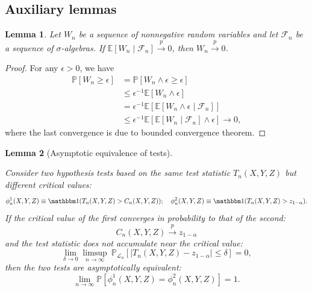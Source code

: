 \documentclass[12pt]{article}
\newtheorem{lemma}{Lemma}
\theoremstyle{definition}
\theoremstyle{remark}
\newcommand{\E}{\mathbb E}								%
\renewcommand{\P}{\mathbb{P}}							%
\newcommand{\indicator}{\mathbbm 1}						%
\newcommand{\convp}{\overset p \rightarrow}             %
\newcommand{\srx}{X}									%
\newcommand{\srz}{Z}									%
\newcommand{\sry}{Y}									%
\newcommand{\law}{\mathcal L}							%
\begin{document}
\subsection{Auxiliary lemmas}

\begin{lemma}
	\label{lem:conditional-expectation-to-unconditional}
	Let $W_n$ be a sequence of nonnegative random variables and let $\mathcal F_n$ be a sequence of $\sigma$-algebras. If $\E[W_n \mid \mathcal{F}_n]\convp 0$, then $ W_n \convp 0$.
\end{lemma}
\begin{proof}
	For any $\epsilon>0$, we have
	\begin{align}
		\P[W_n \geq \epsilon] &= \P[W_n \wedge \epsilon \geq \epsilon] \\
		&\leq \epsilon^{-1} \E[W_n \wedge \epsilon] \\
		&= \epsilon^{-1} \E[\E[W_n \wedge \epsilon\mid \mathcal{F}_n]]\\
		&\leq \epsilon^{-1} \E[\E[W_n \mid \mathcal{F}_n]\wedge \epsilon] \to 0,
	\end{align}
	where the last convergence is due to bounded convergence theorem. 
\end{proof}


\begin{lemma}[Asymptotic equivalence of tests] \label{lem:equivalence-lemma}
	
Consider two hypothesis tests based on the same test statistic $T_n(\srx, \sry, \srz)$ but different critical values:
\begin{equation*}
\phi_n^1(\srx, \sry, \srz) \equiv \indicator(T_n(\srx, \sry, \srz) > C_n(\srx, \sry, \srz)); \quad \phi_n^2(\srx, \sry, \srz) \equiv \indicator(T_n(\srx, \sry, \srz) > z_{1-\alpha}). 
\end{equation*}
If the critical value of the first converges in probability to that of the second:
\begin{equation}
C_n(\srx, \sry, \srz) \convp z_{1-\alpha}
\label{eq:convergence-of-critical-value}
\end{equation}
and the test statistic does not accumulate near the critical value:
\begin{equation}
\lim_{\delta \rightarrow 0}\limsup_{n \rightarrow \infty}\ \P_{\law_n}[|T_n(\srx, \sry, \srz)-z_{1-\alpha}| \leq \delta] = 0,
\label{eq:non-accumulation-app}
\end{equation}
then the two tests are asymptotically equivalent:
\begin{equation}
\lim_{n \rightarrow \infty}\P[\phi_n^{1}(\srx, \sry, \srz) = \phi_n^2(\srx, \sry, \srz)] = 1.
\end{equation}
\end{lemma}
\end{document}

